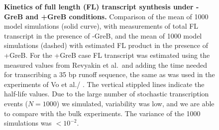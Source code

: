 \documentclass{bmcart}
\begin{document}
\begin{backmatter}
\begin{figure}[h!]
    \begin{center}
    \end{center}
    \caption{ {\bf Kinetics of full length (FL) transcript synthesis under
      -GreB and +GreB conditions.}
      Comparison of the mean of 1000 model simulations (solid curve), with
      measurements \citep[squares, ][]{vo_vitro_2003-1} of total FL transcript
      in the presence of -GreB, and the mean of 1000 model simulations (dashed)
      with estimated FL product in the presence of +GreB. For the +GreB case FL
      transcript was estimated using the measured values from Revyakin et al.\
      and adding the time needed for transcribing a 35 bp runoff sequence, the
      same as was used in the experiments of Vo et al./
      \cite{vo_vitro_2003-1}. The vertical stippled lines indicate the
      half-life values. Due to the large number of stochastic transcription
      events ($N=1000$) we simulated, variability was low, and we are able to
      compare with the bulk experiments. The variance of the 1000 simulations
      was $<10^{-2}$.}
  \label{fig:vo_comparison}
\end{figure}

% 
\end{backmatter}
\end{document}
